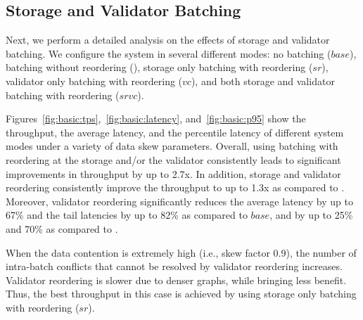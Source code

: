 \subsection{Storage and Validator Batching}
\label{subsec:experiment:batching}

Next, we perform a detailed analysis on the effects of storage and validator batching. We configure the system in several different modes: no batching ($base$), batching without reordering (), storage only batching with reordering ($sr$), validator only batching with reordering
($vc$), and both storage and validator batching with reordering ($srvc$).




Figures~\ref{fig:basic:tps},~\ref{fig:basic:latency}, and~\ref{fig:basic:p95} show the throughput, the average latency, and the percentile latency of different system modes under a variety of data skew parameters. Overall, using batching with reordering at the storage and/or the validator consistently leads to significant improvements in throughput by up to 2.7x. In addition, storage and validator reordering consistently improve the throughput to up to 1.3x as compared to . Moreover, validator reordering significantly reduces the average latency by up to 67\% and the tail latencies by up to 82\% as compared to $base$, and by up to 25\% and 70\% as compared to .

When the data contention is extremely high (i.e., skew factor 0.9), the number of intra-batch conflicts
that cannot be resolved by validator reordering increases. Validator reordering
is slower due to denser graphs, while bringing less benefit. Thus, the best throughput in this case is achieved by using storage only batching with reordering ($sr$). 


